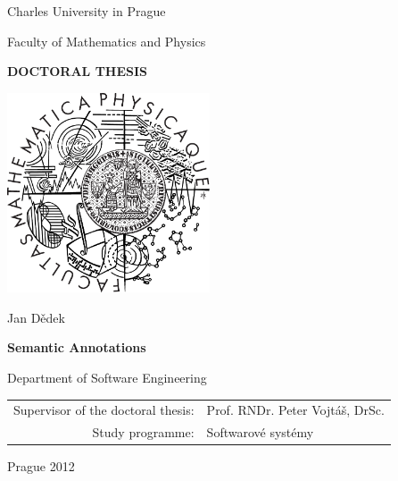 \documentclass[12pt,a4paper,twoside,openright]{report}
\def\myauthor{Jan Dědek}
\def\mytitle{Semantic Annotations}
\def\mysupervisor{Prof. RNDr. Peter Vojtáš, DrSc.}
\def\mydepartment{Department of Software Engineering}
\begin{document}

\pagestyle{empty}
\begin{center}

\large

Charles University in Prague

\medskip

Faculty of Mathematics and Physics

\vfill

{\bf\Large DOCTORAL THESIS}

\vfill

\centerline{\mbox{\includegraphics[width=60mm]{style/logo}}}

\vfill
\vspace{5mm}

{\LARGE \myauthor}

\vspace{15mm}

{\LARGE\bfseries \mytitle}

\vfill

\mydepartment

\vfill

\begin{tabular}{rl}

Supervisor of the doctoral thesis: & \mysupervisor \\
\noalign{\vspace{2mm}}
Study programme: & Softwarové systémy \\
\end{tabular}

\vfill

Prague 2012

\end{center}
\end{document}
